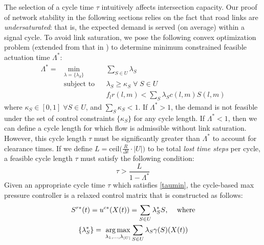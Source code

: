 The selection of a cycle time $\tau$ intuitively affects intersection capacity. Our proof of network stability in the following sections relies on the fact that road links are \emph{undersaturated}: that is, the expected demand is served (on average) within a signal cycle. To avoid link saturation, 
we pose the following convex optimization problem (extended from that in \cite{MaxPressureStochastic}) to determine minimum constrained feasible actuation time $\Lambda^*$:
\begin{equation} \label{sum_lambda}
\begin{aligned}
\Lambda ^{*} = & \min_{\lambda = \{\lambda_S\}}
& & \sum_{S\in U} \lambda_{S} \\
& \text{subject to}
& &  \lambda_{S} \geq \kappa_S \; \forall \; S\in U\\
&&& f_{l}r(l,m) < \sum_{S}\lambda_{S} c(l,m)S(l,m)
\end{aligned}
\end{equation}
where $\kappa_S \in [0,1] \; \forall S\in U$, and $\sum_S \kappa_S <1$. If $\Lambda^* > 1$, the demand is not feasible under the set of control constraints $\{\kappa_S\}$ for any cycle length. If $\Lambda^* < 1$, then we can define a cycle length for which flow is admissible without link saturation. However, this cycle length $\tau$ must be significantly greater than $\Lambda^*$ to account for clearance times. If we define $L = \text{ceil}\big(\frac{R}{\Delta t} \cdot |U|\big)$ to be total \emph{lost time steps} per cycle, a feasible cycle length $\tau$ must satisfy the following condition: 
\begin{equation} \label{taumin} \tau > \frac{L}{1-\Lambda^*} \end{equation} 
Given an appropriate cycle time $\tau$ which satisfies \eqref{taumin}, the cycle-based max pressure controller is a relaxed control matrix that is constructed as follows:
\begin{gather} \label{uc*} 
S^{r*}(t) = u^{c*} (X(t)) = \sum_{S \in U}\lambda_{S}^{*}S \text{, \quad where} \\
  \label{distMP_LP}
\{ \lambda^*_S \} = \;  \underset{\lambda_{1},...,\lambda_{\vert U\vert}}{ \arg \max} \sum_{S \in U}\lambda_{S}\gamma(S)(X(t))
\end{gather}
